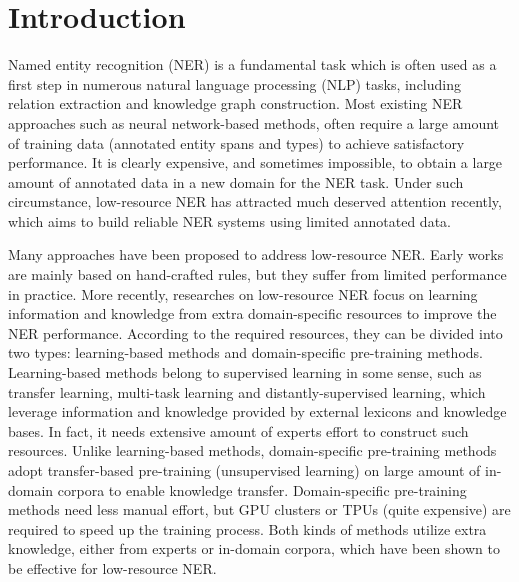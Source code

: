 \documentclass[10pt, conference, compsocconf]{IEEEtran}
\begin{document}
\section{Introduction}
Named entity recognition (NER) is a fundamental task which is often used as a first step 
in numerous natural language processing (NLP) tasks, including
relation extraction\cite{li2016biocreative,ren2017cotype} and knowledge graph construction\cite{lin2015learning,luan-etal-2018-multi}.
Most existing NER approaches such as neural network-based methods\cite{lample-etal-2016-neural,ma-hovy-2016-end,liu2018empower}, 
often require a large amount of training data (annotated entity spans and types) to achieve satisfactory performance.
It is clearly expensive, and sometimes
impossible, to obtain a large amount of annotated data in a new domain for the NER
task. Under such circumstance, low-resource NER has attracted much deserved attention recently,
which aims to build reliable NER systems using limited annotated data.




Many approaches have been proposed to address low-resource NER.
Early works are mainly based on hand-crafted rules\cite{collobert2011natural,yang2012extracting,luo2015joint}, but they suffer from limited performance in practice. 
More recently, researches on low-resource NER focus on learning information and knowledge from extra domain-specific resources to improve the NER performance.
According to the required resources, they can be divided into two types: 
learning-based methods\cite{luan-etal-2018-multi,zhou-etal-2019-dual,shang-etal-2018-learning} and domain-specific pre-training methods\cite{beltagy-etal-2019-scibert,lee2020biobert}. 
Learning-based methods belong to supervised learning in some sense, such as transfer learning, multi-task learning 
and distantly-supervised learning,
which leverage information and knowledge provided by external lexicons and knowledge bases. 
In fact, it needs extensive amount of experts effort to construct such  resources.
Unlike learning-based methods, domain-specific pre-training methods 
adopt transfer-based pre-training (unsupervised learning) on large amount of in-domain corpora to enable knowledge transfer. 
Domain-specific pre-training methods need less manual effort, but GPU clusters or TPUs (quite expensive) are required to speed up the training process.
Both kinds of methods utilize extra knowledge, either from experts or in-domain corpora,
which have been shown to be effective for low-resource NER.
\end{document}
